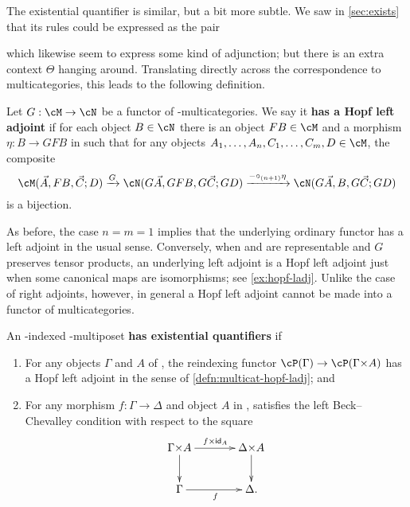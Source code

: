 The existential quantifier is similar, but a bit more subtle.
We saw in \cref{sec:exists} that its rules could be expressed as the pair
which likewise seem to express some kind of adjunction; but there is an extra context $\Theta$ hanging around.
Translating directly across the correspondence to multicategories, this leads to the following definition.

\begin{defn}\label{defn:multicat-hopf-ladj}
  Let $G:\cM\to\cN$ be a functor of \fS-multicategories.
  We say it \textbf{has a Hopf left adjoint} if for each object $B\in\cN$ there is an object $FB\in\cM$ and a morphism $\eta:B\to GFB$ in \cN such that for any objects $A_1,\dots,A_n,C_1,\dots,C_m,D\in \cM$, the composite
  \[ \cM(\vec A,FB,\vec C;D) \xto{G} \cN(G\vec A, GFB, G\vec C; GD) \xto{-\circ_{(n+1)} \eta} \cN(G\vec A, B, G\vec C; GD) \]
  is a bijection.
\end{defn}

As before, the case $n=m=1$ implies that the underlying ordinary functor has a left adjoint in the usual sense.
Conversely, when \cM and \cN are representable and $G$ preserves tensor products, an underlying left adjoint is a Hopf left adjoint just when some canonical maps are isomorphisms; see \cref{ex:hopf-ladj}.
Unlike the case of right adjoints, however, in general a Hopf left adjoint cannot be made into a functor of multicategories.

\begin{defn}
  An \cS-indexed \fS-multiposet \textbf{has existential quantifiers} if
  \begin{enumerate}
  \item For any objects $\Gamma$ and $A$ of \cS, the reindexing functor $\cP(\Gamma) \to \cP(\Gamma\times A)$ has a Hopf left adjoint in the sense of \cref{defn:multicat-hopf-ladj}; and
  \item For any morphism $f:\Gamma\to\Delta$ and object $A$ in \cS, \cP satisfies the left Beck--Chevalley condition with respect to the square
    \[ \xymatrix@C=3pc{ \Gamma\times A \ar[r]^{f\times \idfunc_A} \ar[d] & \Delta\times A \ar[d] \\ \Gamma \ar[r]_f & \Delta. } \]
  \end{enumerate}
\end{defn}

